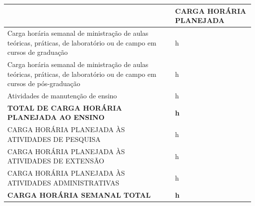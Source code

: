 \documentclass[10pt,a4paper]{article}
\newcounter{hGrad}\setcounter{hGrad}{8}
\newcounter{hPos}\setcounter{hPos}{0}
\newcounter{hManut}\setcounter{hManut}{8}
\newcounter{hEnsino}
\newcounter{hPesquisa}\setcounter{hPesquisa}{16}
\newcounter{hExtensao}\setcounter{hExtensao}{2}
\newcounter{hAdmin}\setcounter{hAdmin}{6}
\newcounter{hTotal}
\begin{document}
\vspace{0.1em}

\renewcommand{\arraystretch}{1.2}
\begin{tabular}{M{12.1cm} C{4cm}}
  \toprule
   & \textbf{CARGA HORÁRIA PLANEJADA} \\
  \midrule
  {\small Carga horária semanal de ministração de aulas teóricas, práticas, de laboratório ou de campo em cursos de graduação} & h \\
  \midrule
  {\small Carga horária semanal de ministração de aulas teóricas, práticas, de laboratório ou de campo em cursos de pós-graduação} & h \\
  \midrule
  {\small Atividades de manutenção de ensino} & h \\
  \midrule
  \textbf{TOTAL DE CARGA HORÁRIA PLANEJADA AO ENSINO} & \textbf{h} \\
  \midrule
  {\small CARGA HORÁRIA PLANEJADA ÀS ATIVIDADES DE PESQUISA} & h \\
  \midrule
  {\small CARGA HORÁRIA PLANEJADA ÀS ATIVIDADES DE EXTENSÃO} & h \\
  \midrule
  {\small CARGA HORÁRIA PLANEJADA ÀS ATIVIDADES ADMINISTRATIVAS} & h \\
  \midrule
  \textbf{CARGA HORÁRIA SEMANAL TOTAL} & \textbf{h} \\
  \bottomrule
\end{tabular}
\end{document}
